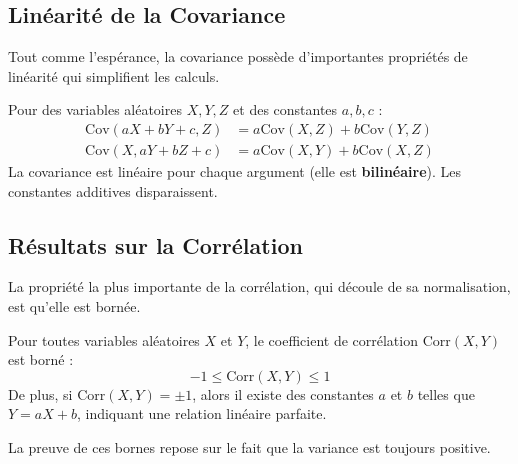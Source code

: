 \subsection{Linéarité de la Covariance}

Tout comme l'espérance, la covariance possède d'importantes propriétés de linéarité qui simplifient les calculs.

\begin{definitionbox}
Pour des variables aléatoires $X, Y, Z$ et des constantes $a, b, c$ :
\begin{align*}
\text{Cov}(aX + bY + c, Z) &= a\text{Cov}(X, Z) + b\text{Cov}(Y, Z) \\
\text{Cov}(X, aY + bZ + c) &= a\text{Cov}(X, Y) + b\text{Cov}(X, Z)
\end{align*}
La covariance est linéaire pour chaque argument (elle est \textbf{bilinéaire}). Les constantes additives disparaissent.
\end{definitionbox}

\subsection{Résultats sur la Corrélation}

La propriété la plus importante de la corrélation, qui découle de sa normalisation, est qu'elle est bornée.

\begin{theorembox}
Pour toutes variables aléatoires $X$ et $Y$, le coefficient de corrélation $\text{Corr}(X,Y)$ est borné :
$$-1 \le \text{Corr}(X,Y) \le 1$$
De plus, si $\text{Corr}(X,Y) = \pm 1$, alors il existe des constantes $a$ et $b$ telles que $Y = aX + b$, indiquant une relation linéaire parfaite.
\end{theorembox}

La preuve de ces bornes repose sur le fait que la variance est toujours positive.

